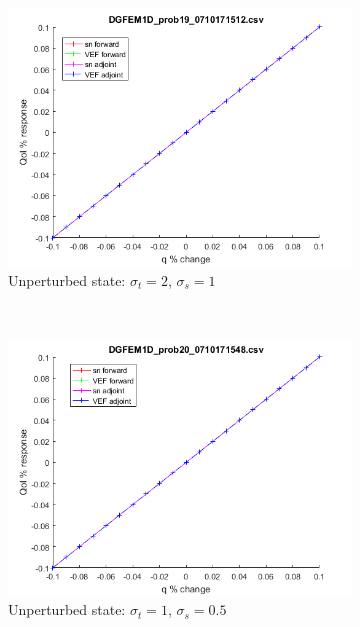 \documentclass{article}
\newcommand{\sigt}{\sigma_t}
\newcommand{\sigs}{\sigma_s}
\begin{document}
\begin{figure}[H]
\label{HomoPertq}
\centering
\begin{subfigure}{.65\textwidth}
  \centering
  \includegraphics[width=.98\linewidth]{figures/19qSens.png}
  \caption{Unperturbed state: $\sigt=2$, $\sigs=1$}
  \label{fig:sfig1}
\end{subfigure}%
\\
\begin{subfigure}{.65\textwidth}
  \centering
  \includegraphics[width=.98\linewidth]{figures/20qSens.png}
  \caption{Unperturbed state: $\sigt=1$, $\sigs=0.5$}
  \label{fig:sfig2}
\end{subfigure}
\\
\begin{subfigure}{.65\textwidth}

\end{subfigure}
\end{figure}
\end{document}
